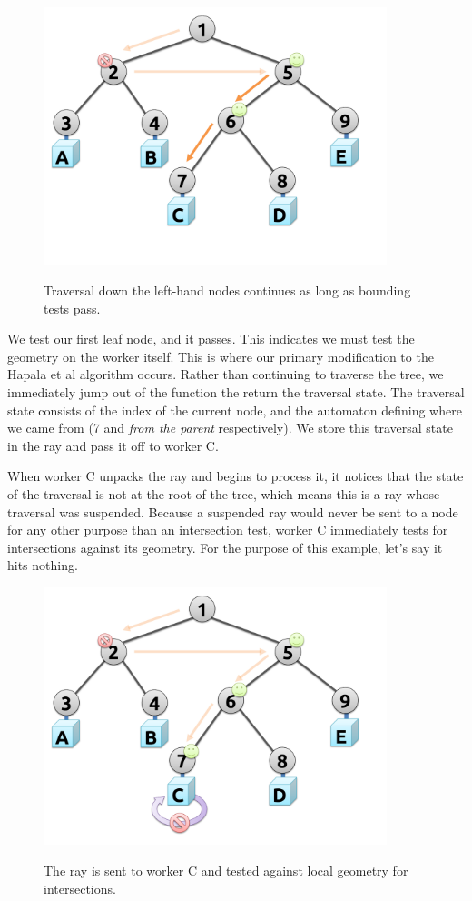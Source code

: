 \documentclass[12pt]{ucthesis}
\newcommand{\captionfonts}{\small\bf\ssp}
\begin{document}
\begin{figure}[H]
    \centering
    \includegraphics[width=100mm]{figures/traversal3.pdf}
    \captionfonts
    \caption{Traversal down the left-hand nodes continues as long as bounding tests pass.}
    \label{fig:traversal3}
\end{figure}

We test our first leaf node, and it passes. This indicates we must test the
geometry on the worker itself. This is where our primary modification to the
Hapala et al \cite{hapala:2011} algorithm occurs. Rather than continuing to
traverse the tree, we immediately jump out of the function the return the
traversal state. The traversal state consists of the index of the current
node, and the automaton defining where we came from (7 and \emph{from the parent}
respectively). We store this traversal state in the ray and pass it off to worker
C.

When worker C unpacks the ray and begins to process it, it notices that the
state of the traversal is not at the root of the tree, which means this is a
ray whose traversal was suspended. Because a suspended ray would never be sent
to a node for any other purpose than an intersection test, worker C immediately
tests for intersections against its geometry. For the purpose of this example,
let's say it hits nothing.

\begin{figure}[H]
    \centering
    \includegraphics[width=100mm]{figures/traversal4.pdf}
    \captionfonts
    \caption{The ray is sent to worker C and tested against local geometry for intersections.}
    \label{fig:traversal4}
\end{figure}
\end{document}
